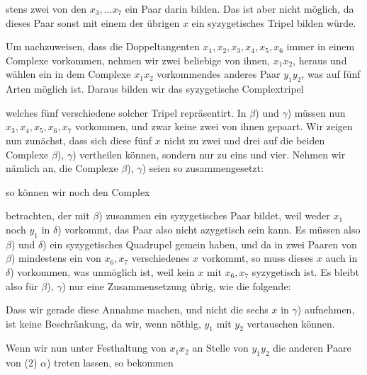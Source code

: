 stens zwei von den $x_3, \dots x_7$ ein Paar darin bilden. Das ist aber nicht möglich, da dieses Paar sonst mit einem der übrigen $x$ ein syzygetisches Tripel bilden würde.

Um nachzuweisen, dass die Doppeltangenten $x_1, x_2, x_3, x_4, x_5, x_6$ immer in einem Complexe vorkommen, nehmen wir zwei beliebige von ihnen, $x_1 x_2$, heraus und wählen ein in dem Complexe $x_1 x_2$ vorkommendes anderes Paar $y_1 y_2$, was auf fünf Arten möglich ist. Daraus bilden wir das syzygetische Complextripel


welches fünf verschiedene solcher Tripel repräsentirt. In $\beta$) und $\gamma$) müssen nun $x_3, x_4, x_5, x_6, x_7$ vorkommen, und zwar keine zwei von ihnen gepaart. Wir zeigen nun zunächst, dass sich diese fünf $x$ nicht zu zwei und drei auf die beiden Complexe $\beta$), $\gamma$) vertheilen können, sondern nur zu eins und vier. Nehmen wir nämlich an, die Complexe $\beta$), $\gamma$) seien so zusammengesetzt:


so können wir noch den Complex


betrachten, der mit $\beta$) zusammen ein syzygetisches Paar bildet, weil weder $x_1$ noch $y_1$ in $\delta$) vorkommt, das Paar also nicht azygetisch sein kann. Es müssen also $\beta$) und $\delta$) ein syzygetisches Quadrupel gemein haben, und da in zwei Paaren von $\beta$) mindestens ein von $x_6, x_7$ verschiedenes $x$ vorkommt, so muss dieses $x$ auch in $\delta$) vorkommen, was unmöglich ist, weil kein $x$ mit $x_6, x_7$ syzygetisch ist. Es bleibt also für $\beta$), $\gamma$) nur eine Zusammensetzung übrig, wie die folgende:


Dass wir gerade diese Annahme machen, und nicht die sechs $x$ in $\gamma$) aufnehmen, ist keine Beschränkung, da wir, wenn n\"othig, $y_1$ mit $y_2$ vertauschen können.

Wenn wir nun unter Festhaltung von $x_1 x_2$ an Stelle von $y_1 y_2$ die anderen Paare von (2) $\alpha$) treten lassen, so bekommen
